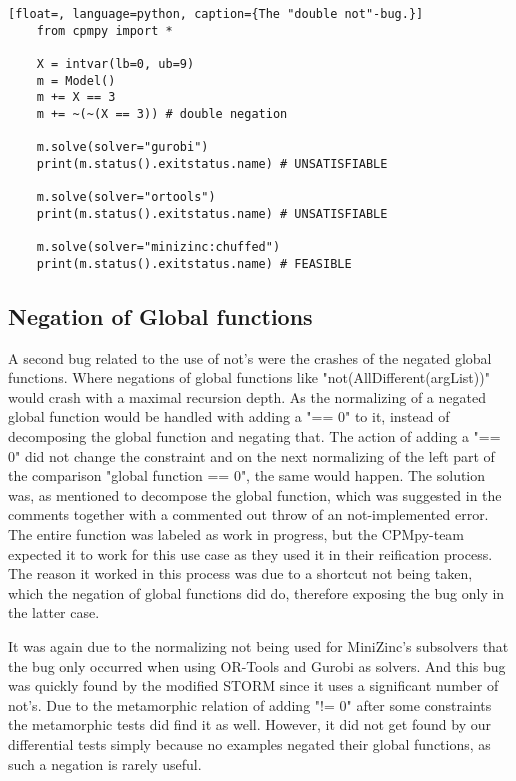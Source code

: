 \label{lst:Bug:DoubleNot}
\begin{lstlisting}[float=, language=python, caption={The "double not"-bug.}]
	from cpmpy import *
	
	X = intvar(lb=0, ub=9)
	m = Model()
	m += X == 3
	m += ~(~(X == 3)) # double negation 
	
	m.solve(solver="gurobi")
	print(m.status().exitstatus.name) # UNSATISFIABLE
	
	m.solve(solver="ortools")
	print(m.status().exitstatus.name) # UNSATISFIABLE
	
	m.solve(solver="minizinc:chuffed")
	print(m.status().exitstatus.name) # FEASIBLE	
\end{lstlisting}

\subsection{Negation of Global functions}
\label{res:bug:NegatedGlobal}
A second bug related to the use of not's were the crashes of the negated global functions. Where negations of global functions like "not(AllDifferent(argList))" would crash with a maximal recursion depth. As the normalizing of a negated global function would be handled with adding a "== 0" to it, instead of decomposing the global function and negating that. The action of adding a "== 0" did not change the constraint and on the next normalizing of the left part of the comparison "global function == 0", the same would happen. The solution was, as mentioned to decompose the global function, which was suggested in the comments together with a commented out throw of an not-implemented error. The entire function was labeled as work in progress, but the CPMpy-team expected it to work for this use case as they used it in their reification process. The reason it worked in this process was due to a shortcut not being taken, which the negation of global functions did do, therefore exposing the bug only in the latter case.

It was again due to the normalizing not being used for MiniZinc's subsolvers that the bug only occurred when using OR-Tools and Gurobi as solvers. And this bug was quickly found by the modified STORM since it uses a significant number of not's. Due to the metamorphic relation of adding "!= 0" after some constraints the metamorphic tests did find it as well. However, it did not get found by our differential tests simply because no examples negated their global functions, as such a negation is rarely useful. 



